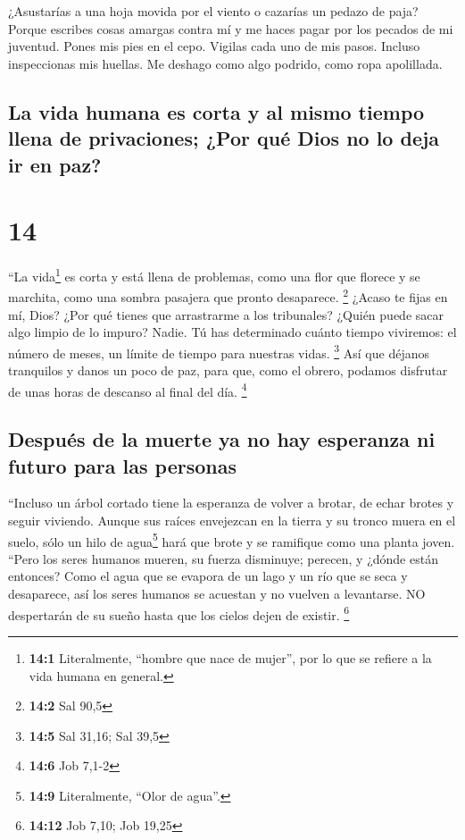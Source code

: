  ¿Asustarías a una hoja movida por el viento o cazarías
un pedazo de paja?  Porque escribes cosas amargas contra
mí y me haces pagar por los pecados de mi juventud. 
Pones mis pies en el cepo. Vigilas cada uno de mis pasos. Incluso
inspeccionas mis huellas.  Me deshago como algo podrido,
como ropa apolillada.

\hypertarget{la-vida-humana-es-corta-y-al-mismo-tiempo-llena-de-privaciones-por-quuxe9-dios-no-lo-deja-ir-en-paz}{%
\subsection{La vida humana es corta y al mismo tiempo llena de
privaciones; ¿Por qué Dios no lo deja ir en
paz?}\label{la-vida-humana-es-corta-y-al-mismo-tiempo-llena-de-privaciones-por-quuxe9-dios-no-lo-deja-ir-en-paz}}

\hypertarget{section-13}{%
\section{14}\label{section-13}}

 ``La vida\footnote{\textbf{14:1} Literalmente, ``hombre
  que nace de mujer'', por lo que se refiere a la vida humana en
  general.} es corta y está llena de problemas,  como una
flor que florece y se marchita, como una sombra pasajera que pronto
desaparece. \footnote{\textbf{14:2} Sal 90,5}  ¿Acaso te
fijas en mí, Dios? ¿Por qué tienes que arrastrarme a los tribunales?
 ¿Quién puede sacar algo limpio de lo impuro? Nadie.
 Tú has determinado cuánto tiempo viviremos: el número de
meses, un límite de tiempo para nuestras vidas. \footnote{\textbf{14:5}
  Sal 31,16; Sal 39,5}  Así que déjanos tranquilos y danos
un poco de paz, para que, como el obrero, podamos disfrutar de unas
horas de descanso al final del día. \footnote{\textbf{14:6} Job 7,1-2}

\hypertarget{despuuxe9s-de-la-muerte-ya-no-hay-esperanza-ni-futuro-para-las-personas}{%
\subsection{Después de la muerte ya no hay esperanza ni futuro para las
personas}\label{despuuxe9s-de-la-muerte-ya-no-hay-esperanza-ni-futuro-para-las-personas}}

 ``Incluso un árbol cortado tiene la esperanza de volver a
brotar, de echar brotes y seguir viviendo.  Aunque sus
raíces envejezcan en la tierra y su tronco muera en el suelo,
 sólo un hilo de agua\footnote{\textbf{14:9} Literalmente,
  ``Olor de agua''.} hará que brote y se ramifique como una planta
joven.  ``Pero los seres humanos mueren, su fuerza
disminuye; perecen, y ¿dónde están entonces?  Como el
agua que se evapora de un lago y un río que se seca y desaparece,
 así los seres humanos se acuestan y no vuelven a
levantarse. NO despertarán de su sueño hasta que los cielos dejen de
existir. \footnote{\textbf{14:12} Job 7,10; Job 19,25}

